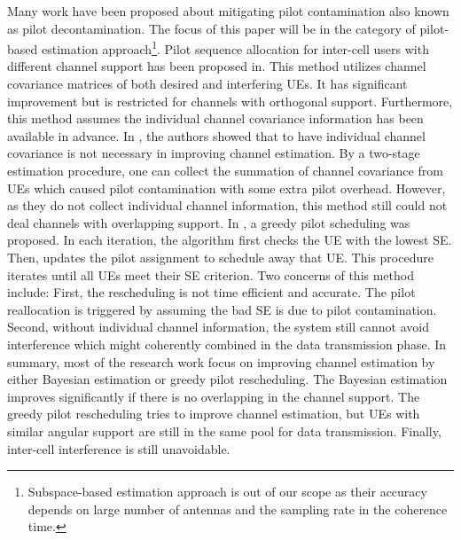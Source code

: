 Many work have been proposed about mitigating pilot contamination also known as pilot decontamination. The focus of this paper will be in the category of pilot-based estimation approach\cite{elijah2016comprehensive}\footnote{Subspace-based estimation approach is out of our scope as their accuracy depends on large number of antennas and the sampling rate in the coherence time.}. Pilot sequence allocation for inter-cell users with different channel support has been proposed in\cite{yin2013coordinated,adhikary2013joint,you2015pilot}. This method utilizes channel covariance matrices of both desired and interfering UEs. It has significant improvement but is restricted for channels with orthogonal support. Furthermore, this method assumes the individual channel covariance information has been available in advance. In \cite{bjornson2016massive}, the authors showed that to have individual channel covariance is not necessary in improving channel estimation. By a two-stage estimation procedure, one can collect the summation of channel covariance from UEs which caused pilot contamination with some extra pilot overhead. However, as they do not collect individual channel information, this method still could not deal channels with overlapping support. In \cite{ngo2017cell}, a greedy pilot scheduling was proposed. In each iteration, the algorithm first checks the UE with the lowest SE. Then, updates the pilot assignment to schedule away that UE. This procedure iterates until all UEs meet their SE criterion. Two concerns of this method include: First, the rescheduling is not time efficient and accurate. The pilot reallocation is triggered by assuming the bad SE is due to pilot contamination. Second, without individual channel information, the system still cannot avoid interference which might coherently combined in the data transmission phase. In summary, most of the research work focus on improving channel estimation by either Bayesian estimation or greedy pilot rescheduling. The Bayesian estimation improves significantly if there is no overlapping in the channel support. The greedy pilot rescheduling tries to improve channel estimation, but UEs with similar angular support are still in the same pool for data transmission. Finally, inter-cell interference is still unavoidable.


